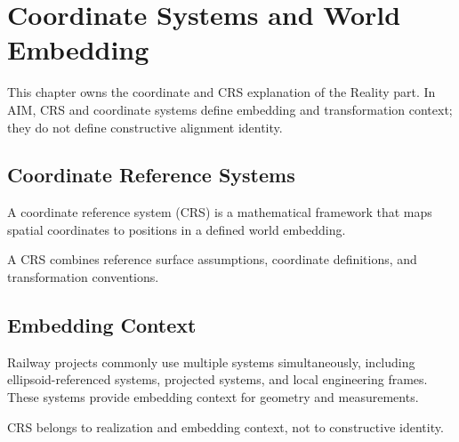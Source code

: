 
\chapter{Coordinate Systems and World Embedding}

\label{chap:coordinate-systems}


This chapter owns the coordinate and CRS explanation of the Reality
part. In AIM, CRS and coordinate systems define embedding and
transformation context; they do not define constructive alignment
identity.



\section{Coordinate Reference Systems}

\begin{definition}
A coordinate reference system (CRS) is a mathematical framework that
maps spatial coordinates to positions in a defined world embedding.
\end{definition}

A CRS combines reference surface assumptions, coordinate definitions,
and transformation conventions.

\section{Embedding Context}

Railway projects commonly use multiple systems simultaneously, including
ellipsoid-referenced systems, projected systems, and local engineering
frames. These systems provide embedding context for geometry and
measurements.

\begin{principle}
CRS belongs to realization and embedding context, not to constructive
identity.
\end{principle}

